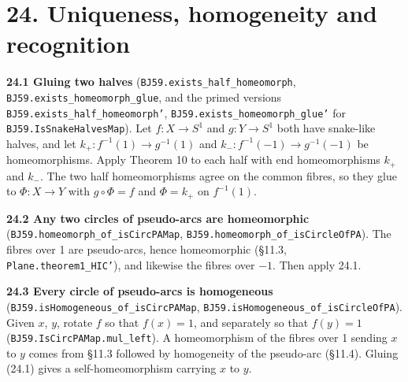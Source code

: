 \documentclass[11pt]{article}
\newcommand{\lean}[1]{\texttt{#1}}
\begin{document}
\section*{24. Uniqueness, homogeneity and recognition}

\textbf{24.1 Gluing two halves} (\lean{BJ59.\hspace{0pt}exists\_\hspace{0pt}half\_\hspace{0pt}homeomorph}, \lean{BJ59.\hspace{0pt}exists\_\hspace{0pt}homeomorph\_\hspace{0pt}glue}, and the primed versions \lean{BJ59.\hspace{0pt}exists\_\hspace{0pt}half\_\hspace{0pt}homeomorph'}, \lean{BJ59.\hspace{0pt}exists\_\hspace{0pt}homeomorph\_\hspace{0pt}glue'} for \lean{BJ59.\hspace{0pt}IsSnakeHalvesMap}). Let $f : X \to S^1$ and $g : Y \to S^1$ both have snake-like halves, and let $k_+ : f^{-1}(1) \to g^{-1}(1)$ and $k_- : f^{-1}(-1) \to g^{-1}(-1)$ be homeomorphisms. Apply Theorem 10 to each half with end homeomorphisms $k_+$ and $k_-$. The two half homeomorphisms agree on the common fibres, so they glue to $\Phi : X \to Y$ with $g \circ \Phi = f$ and $\Phi = k_+$ on $f^{-1}(1)$.

\textbf{24.2 Any two circles of pseudo-arcs are homeomorphic} (\lean{BJ59.\hspace{0pt}homeomorph\_\hspace{0pt}of\_\hspace{0pt}isCircPAMap}, \lean{BJ59.\hspace{0pt}homeomorph\_\hspace{0pt}of\_\hspace{0pt}isCircleOfPA}). The fibres over 1 are pseudo-arcs, hence homeomorphic (\S{}11.3, \lean{Plane.\hspace{0pt}theorem1\_\hspace{0pt}HIC'}), and likewise the fibres over $-1$. Then apply 24.1.

\textbf{24.3 Every circle of pseudo-arcs is homogeneous} (\lean{BJ59.\hspace{0pt}isHomogeneous\_\hspace{0pt}of\_\hspace{0pt}isCircPAMap}, \lean{BJ59.\hspace{0pt}isHomogeneous\_\hspace{0pt}of\_\hspace{0pt}isCircleOfPA}). Given $x$, $y$, rotate $f$ so that $f(x) = 1$, and separately so that $f(y) = 1$ (\lean{BJ59.\hspace{0pt}IsCircPAMap.\hspace{0pt}mul\_\hspace{0pt}left}). A homeomorphism of the fibres over 1 sending $x$ to $y$ comes from \S{}11.3 followed by homogeneity of the pseudo-arc (\S{}11.4). Gluing (24.1) gives a self-homeomorphism carrying $x$ to $y$.
\end{document}
